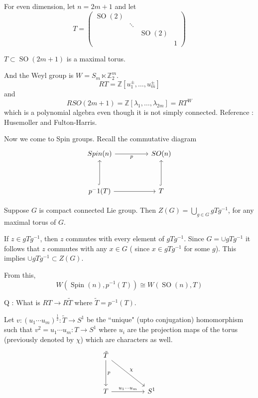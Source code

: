\documentclass[11pt,a4paper]{scrarticle}
\theoremstyle{definition}
\renewenvironment{proof}[1][\proofname]{\vspace{-10pt}\begin{myproof}}{\end{myproof}}
\theoremstyle{greenbox}
\newcommand{\Z}{\mathbb{Z}}
\begin{document}
For even dimension, let $ n = 2m+1 $ and let 
\[ T = \begin{pmatrix}
    \operatorname{SO}(2) & &  &\\
    & \ddots & & \\
    & & \operatorname{SO}(2) \\
    & & & 1
\end{pmatrix} \]
\begin{lemma}
    $ T \subset \operatorname{SO}(2m+1) $ is a maximal torus. 
\end{lemma}
And the Weyl group is $ W = S_{m} \ltimes \Z_{2}^{m} $. 
\[ RT = \Z[u_{1}^{\pm}, \dots, u_{m}^{\pm}] \]
and 
\[ RSO(2m+1) = \Z[\lambda_{1}, \dots, \lambda_{2m}] = RT^{W} \]
which is a polynomial algebra even though it is not simply connected. 
Reference : Husemoller and Fulton-Harris. 


Now we come to Spin groups. Recall the commutative diagram %
\[\begin{tikzcd}
	{Spin(n)} && {SO(n)} \\
	\\
	{p^-1(T)} && T
	\arrow[from=3-1, to=3-3]
	\arrow[hook, from=3-3, to=1-3]
	\arrow["p"', from=1-1, to=1-3]
	\arrow[hook, from=3-1, to=1-1]
\end{tikzcd}\]

\begin{lemma}
    Suppose $ G $ is compact connected Lie group. Then $ Z(G) = \bigcup_{g \in G}gTg^{-1} $, for any maximal torus of $ G $. 
\end{lemma}

\begin{proof}
    If $ z \in gTg^{-1} $, then $ z $ commutes with every element of $ gTg^{-1} $. Since $ G = \cup gTg^{-1}$ it follows that $ z $ commutes with any $ x \in G $ ( since $ x \in gTg^{-1} $ for some $ g $). This implies $ \cup gTg^{-1}  \subset Z(G)$. 
\end{proof}

From this, 
\[ W(\operatorname{Spin}(n), p^{-1}(T)) \cong W(\operatorname{SO}(n), T) \]

Q : What is $ RT \to R \tilde{T} $ where $ \tilde{T} = p^{-1}(T) $.

Let $ v : (u_{1} \cdots u_{m})^{\frac{1}{2}} : \tilde{T} \to S^{1} $ be the ``unique" (upto conjugation) homomorphism such that $ v^{2} = u_{1} \cdots u_{m} : T \to S^{1} $ where $ u_{i} $ are the projection maps of the torus (previously denoted by $ \chi $) which are characters as well.  
\[\begin{tikzcd}
	{\tilde{T}} \\
	\\
	T && {S^1}
	\arrow["{u_1 \cdots u_m}", from=3-1, to=3-3]
	\arrow["\chi", from=1-1, to=3-3]
	\arrow["p", from=1-1, to=3-1]
\end{tikzcd}\]
\end{document}
